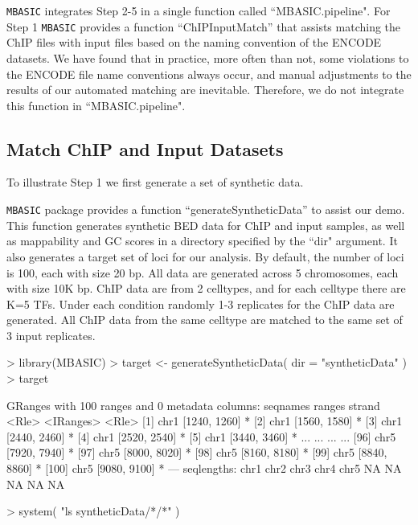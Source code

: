 \documentclass[a4paper,10pt]{article}
\begin{document}
\texttt{MBASIC} integrates Step 2-5 in a single function called ``MBASIC.pipeline". For Step 1 \texttt{MBASIC} provides a function ``ChIPInputMatch'' that assists matching the ChIP files with input files based on the naming convention of the ENCODE datasets. We have found that in practice, more often than not, some violations to the ENCODE file name conventions always occur, and manual adjustments to the results of our automated matching are inevitable. Therefore, we do not integrate this function in ``MBASIC.pipeline".

\subsection{Match ChIP and Input Datasets}


To illustrate Step 1 we first generate a set of synthetic data.

\texttt{MBASIC} package provides a function ``generateSyntheticData'' to assist our demo. This function generates synthetic BED data for ChIP and input samples, as well as mappability and GC scores in a directory specified by the ``dir" argument. It also generates a target set of loci for our analysis. By default, the number of loci is 100, each with size 20 bp. All data are generated across 5 chromosomes, each with size 10K bp. ChIP data are from 2 celltypes, and for each celltype there are K=5 TFs. Under each condition randomly 1-3 replicates for the ChIP data are generated. All ChIP data from the same celltype are matched to the same set of 3 input replicates. 

\begin{Schunk}
\begin{Sinput}
> library(MBASIC)
> target <- generateSyntheticData( dir = "syntheticData" )
> target
\end{Sinput}
\begin{Soutput}
GRanges with 100 ranges and 0 metadata columns:
        seqnames       ranges strand
           <Rle>    <IRanges>  <Rle>
    [1]     chr1 [1240, 1260]      *
    [2]     chr1 [1560, 1580]      *
    [3]     chr1 [2440, 2460]      *
    [4]     chr1 [2520, 2540]      *
    [5]     chr1 [3440, 3460]      *
    ...      ...          ...    ...
   [96]     chr5 [7920, 7940]      *
   [97]     chr5 [8000, 8020]      *
   [98]     chr5 [8160, 8180]      *
   [99]     chr5 [8840, 8860]      *
  [100]     chr5 [9080, 9100]      *
  ---
  seqlengths:
   chr1 chr2 chr3 chr4 chr5
     NA   NA   NA   NA   NA
\end{Soutput}
\begin{Sinput}
> system( "ls syntheticData/*/*" )
\end{Sinput}
\end{Schunk}
\end{document}
